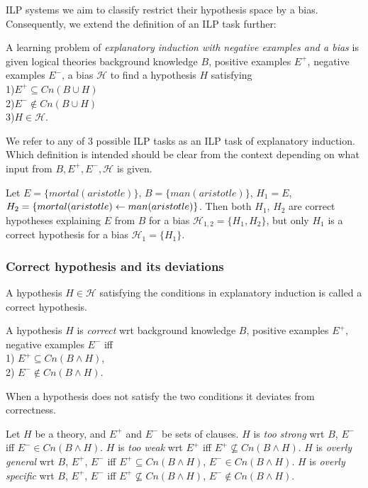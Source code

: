 ILP systems we aim to classify restrict their hypothesis space by a bias. Consequently, we extend the definition of an ILP task further:
\begin{defn}\label{definition_explanatory_induction_with_bias}
A learning problem of \emph{explanatory induction with negative examples and a bias} is given logical theories background knowledge $B$, positive examples $E^{+}$, negative examples $E^{-}$, a bias $\mathcal{H}$ to find a hypothesis $H$ satisfying\\
1)$E^{+} \subseteq Cn(B \cup H)$\\
2)$E^{-} \not\in Cn(B \cup H)$\\
3)$H \in \mathcal{H}$.
\end{defn}

We refer to any of 3 possible ILP tasks as an ILP task of explanatory induction. Which definition is intended should be clear from the context depending on what input from $B, E^+, E^-, \mathcal{H}$ is given.

\begin{exmp}\label{explanatory_induction_example}
Let $E=\{mortal(aristotle)\}$, $B=\{man(aristotle)\}$,
$H_1=E$, $H_2=\{mortal(aristotle) \leftarrow man(aristotle)\}$.
Then both $H_1$, $H_2$ are correct hypotheses explaining $E$ from $B$ for a bias $\mathcal{H}_{1,2}=\{H_1, H_2\}$, but only $H_1$ is a correct hypothesis for a bias $\mathcal{H}_1=\{H_1\}$.
\end{exmp}

\subsubsection{Correct hypothesis and its deviations\cite{nienhuys1997foundations}}\label{correct_hypothesis}
A hypothesis $H \in \mathcal{H}$ satisfying the conditions in explanatory induction is called a correct hypothesis.
\begin{defn}
A hypothesis $H$ is \emph{correct} wrt background knowledge $B$, positive examples $E^+$, negative examples $E^-$ iff\\
1) $E^+ \subseteq Cn(B \land H)$,\\
2) $E^- \not\in Cn(B \land H)$.
\end{defn}

When a hypothesis does not satisfy the two conditions it deviates from correctness.

\begin{defn}
Let $H$ be a theory, and $E^+$ and $E^-$ be sets of clauses.
$H$ is \emph{too strong} wrt $B$, $E^-$ iff
$E^- \in Cn(B \land H)$.
$H$ is \emph{too weak} wrt
$E^+$ iff $E^+ \not\subseteq Cn(B \land H)$.
$H$ is \emph{overly general} wrt $B$, $E^+$, $E^-$ iff
$E^+ \subseteq Cn(B \land H)$, $E^- \in Cn(B \land H)$.
$H$ is \emph{overly specific} wrt $B$, $E^+$, $E^-$ iff
$E^+ \not\subseteq Cn(B \land H)$, $E^- \not\in Cn(B \land H)$.
\end{defn}

